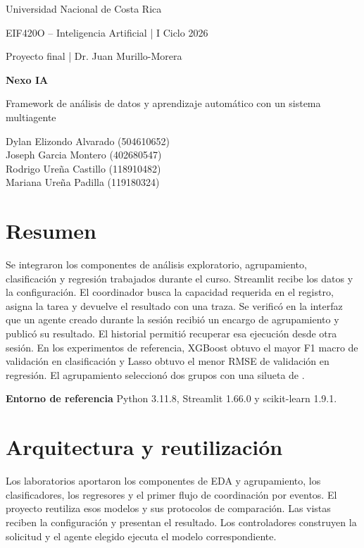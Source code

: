 \documentclass[11pt,a4paper]{article}
\begin{document}
\thispagestyle{empty}
{\color{ink}\large Universidad Nacional de Costa Rica\par}
{EIF420O -- Inteligencia Artificial \quad | \quad I Ciclo 2026\par}
{Proyecto final \quad | \quad Dr. Juan Murillo-Morera\par}

\vspace{23mm}
{\color{ink}\Huge\bfseries Nexo IA\par}
\vspace{3mm}
{\LARGE Framework de análisis de datos y aprendizaje automático con un sistema multiagente\par}
\vspace{14mm}
Dylan Elizondo Alvarado (504610652)\\
Joseph Garcia Montero (402680547)\\
Rodrigo Ureña Castillo (118910482)\\
Mariana Ureña Padilla (119180324)

\vspace{19mm}
\section*{Resumen}
Se integraron los componentes de análisis exploratorio, agrupamiento, clasificación y regresión trabajados durante el curso. Streamlit recibe los datos y la configuración. El coordinador busca la capacidad requerida en el registro, asigna la tarea y devuelve el resultado con una traza. Se verificó en la interfaz que un agente creado durante la sesión recibió un encargo de agrupamiento y publicó su resultado. El historial permitió recuperar esa ejecución desde otra sesión. En los experimentos de referencia, XGBoost obtuvo el mayor F1 macro de validación en clasificación y Lasso obtuvo el menor RMSE de validación en regresión. El agrupamiento seleccionó dos grupos con una silueta de \ClusterScore.

\vfill
\textbf{Entorno de referencia} \enspace Python 3.11.8, Streamlit 1.66.0 y scikit-learn 1.9.1.
\clearpage

\section{Arquitectura y reutilización}

Los laboratorios aportaron los componentes de EDA y agrupamiento, los clasificadores, los regresores y el primer flujo de coordinación por eventos. El proyecto reutiliza esos modelos y sus protocolos de comparación. Las vistas reciben la configuración y presentan el resultado. Los controladores construyen la solicitud y el agente elegido ejecuta el modelo correspondiente.
\end{document}
